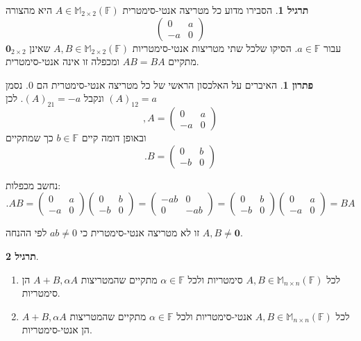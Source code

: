 \documentclass[12pt]{report}
\theoremstyle{plain}
\theoremstyle{definition}
\newtheorem{exercise}{תרגיל}[chapter]
\newtheorem*{solution}{פתרון}
\newcommand{\F}{\mathbb{F}}
\newcommand{\M}{\mathbb{M}}
\newcommand{\0}{\mathbf{0}}
\begin{document}
\begin{exercise}
הסבירו מדוע כל מטריצה אנטי-סימטרית
$A\in\M_{2\times 2}(\F)$
היא מהצורה 
$$
\begin{pmatrix}
0 &a\\
-a &0
\end{pmatrix}
$$
עבור 
$a\in\F$.
הסיקו שלכל שתי מטריצות אנטי-סימטריות 
$A,B\in\M_{2\times 2}(\F)$
שאינן 
$\0_{2\times 2}$
מתקיים
$AB=BA$
ומכפלה זו אינה אנטי-סימטרית.
\end{exercise}

\begin{solution}
האיברים על האלכסון הראשי של כל מטריצה אנטי-סימטרית הם
$0$.
נסמן
$(A)_{12}=a$
ונקבל
$(A)_{21}=-a$.
לכן 
$$
,A=\begin{pmatrix}
0 &a\\
-a &0
\end{pmatrix}
$$
ובאופן דומה קיים
$b\in\F$
כך שמתקיים
$$
.B=\begin{pmatrix}
0 &b\\
-b &0
\end{pmatrix}
$$

נחשב מכפלות:
$$
.AB=\begin{pmatrix}
0 &a\\
-a &0
\end{pmatrix}\begin{pmatrix}
0 &b\\
-b &0
\end{pmatrix}=\begin{pmatrix}
-ab &0 \\
0 &-ab
\end{pmatrix}=\begin{pmatrix}
0 &b\\
-b &0
\end{pmatrix}\begin{pmatrix}
0 &a\\
-a &0
\end{pmatrix}=BA
$$

זו לא מטריצה אנטי-סימטרית כי 
$ab\neq 0$
לפי ההנחה
$A,B\neq\0$.

\end{solution}

\begin{exercise}\
\begin{enumerate}[label=\alph*.]
\item
לכל 
$A,B\in\M_{n\times n}(\F)$
סימטריות ולכל
$\alpha\in\F$
מתקיים שהמטריצות
$A+B,\alpha A$
הן סימטריות.


\item 
לכל 
$A,B\in\M_{n\times n}(\F)$
אנטי-סימטריות ולכל
$\alpha\in\F$
מתקיים שהמטריצות
$A+B,\alpha A$
הן אנטי-סימטריות.


\end{enumerate}
\end{exercise}
\end{document}
